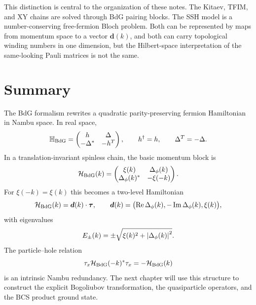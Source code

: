This distinction is central to the organization of these notes.  The Kitaev,
TFIM, and XY chains are solved through BdG pairing blocks.  The SSH model is a
number-conserving free-fermion Bloch problem.  Both can be represented by maps
from momentum space to a vector $\bm{d}(k)$, and both can carry topological
winding numbers in one dimension, but the Hilbert-space interpretation of the
same-looking Pauli matrices is not the same.

\section{Summary}

The BdG formalism rewrites a quadratic parity-preserving fermion Hamiltonian in
Nambu space.  In real space,
\begin{equation}
    \mathbb{H}_{\rm BdG}
    =
    \begin{pmatrix}
        h&\Delta\\
        -\Delta^*&-h^T
    \end{pmatrix},
    \qquad
    h^\dagger=h,
    \qquad
    \Delta^T=-\Delta.
\end{equation}
In a translation-invariant spinless chain, the basic momentum block is
\begin{equation}
    \mathcal{H}_{\rm BdG}(k)
    =
    \begin{pmatrix}
        \xi(k)&\Delta_\phi(k)\\
        \Delta_\phi(k)^*&-\xi(-k)
    \end{pmatrix}.
\end{equation}
For $\xi(-k)=\xi(k)$ this becomes a two-level Hamiltonian
\begin{equation}
    \mathcal{H}_{\rm BdG}(k)=\bm{d}(k)\cdot\bm{\tau},
    \qquad
    \bm{d}(k)=
    \bigl(\operatorname{Re}\Delta_\phi(k),
    -\operatorname{Im}\Delta_\phi(k),
    \xi(k)\bigr),
\end{equation}
with eigenvalues
\begin{equation}
    E_\pm(k)=\pm\sqrt{\xi(k)^2+\left|\Delta_\phi(k)\right|^2}.
\end{equation}
The particle--hole relation
\begin{equation}
    \tau_x\mathcal{H}_{\rm BdG}(-k)^*\tau_x=-\mathcal{H}_{\rm BdG}(k)
\end{equation}
is an intrinsic Nambu redundancy.  The next chapter will use this structure to
construct the explicit Bogoliubov transformation, the quasiparticle operators,
and the BCS product ground state.

